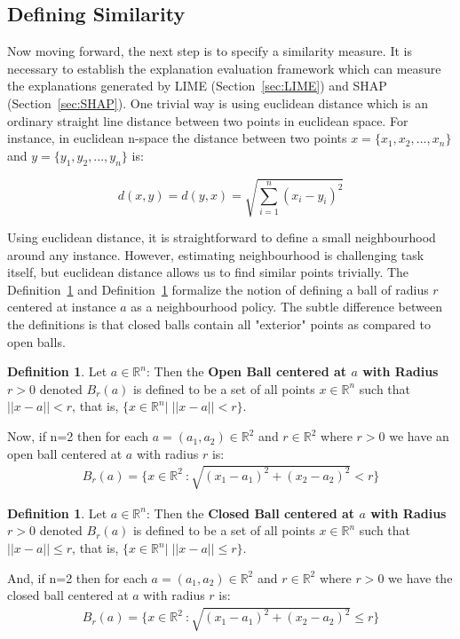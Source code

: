 \documentclass[english]{tktltiki2}
\theoremstyle{definition}
\newtheorem{definition}[thm]{Definition}
\theoremstyle{remark}
\begin{document}
\subsection{Defining Similarity}\label{sec:defining_similarity} %
Now moving forward, the next step is to specify a similarity measure. It is necessary to establish the explanation evaluation framework which can measure the explanations generated by LIME (Section~\ref{sec:LIME}) and SHAP (Section~\ref{sec:SHAP}). One trivial way is using euclidean distance which is an ordinary straight line distance between two points in euclidean space. For instance, in euclidean n-space the distance between two points $x = \{x_1, x_2, ..., x_n\}$ and $y = \{y_1, y_2, ..., y_n\}$ is:

\begin{equation}\label{eq:euclidean_distance}
d(x,y) = d(y,x) = \sqrt{\sum_{i=1}^{n}(x_i - y_i)^2}
\end{equation}

Using euclidean distance, it is straightforward to define a small neighbourhood around any instance. However, estimating neighbourhood is challenging task itself, but euclidean distance allows us to find similar points trivially. The Definition~\ref{def:1} and Definition~\ref{def:2} formalize the notion of defining a ball of radius $r$ centered at instance $a$ as a neighbourhood policy. The subtle difference between the definitions is that closed balls contain all "exterior" points as compared to open balls.

\begin{definition}\label{def:1}{Let $a \in {\mathbb{R}}^n$: Then the \textbf{Open Ball centered at $a$ with Radius $r > 0$} denoted $B_{r}(a)$ is defined to be a set of all points $x \in {\mathbb{R}}^n$ such that $||x-a|| < r$, that is, $\{x \in {\mathbb{R}}^n |\;||x - a|| < r\}.$}
\end{definition}
Now, if n=2 then for each $a = (a_1,a_2) \in {\mathbb{R}}^2$ and $r \in {\mathbb{R}}^2$ where $r > 0$ we have an open ball centered at $a$ with radius $r$ is:
\begin{align*}
B_{r}(a) = \{x \in {\mathbb{R}}^2\ : \sqrt{(x_1 - a_1)^2 + (x_2 - a_2)^2} < r\}
\end{align*}

\begin{definition}\label{def:2}{Let $a \in {\mathbb{R}}^n$: Then the \textbf{Closed Ball centered at $a$ with Radius $r > 0$} denoted $B_{r}(a)$ is defined to be a set of all points $x \in {\mathbb{R}}^n$ such that $||x-a|| \leq r$, that is, $\{x \in {\mathbb{R}}^n |\;||x - a|| \leq r\}.$}
\end{definition}
And, if n=2 then for each $a = (a_1,a_2) \in {\mathbb{R}}^2$ and $r \in {\mathbb{R}}^2$ where $r > 0$ we have the closed ball centered at $a$ with radius $r$ is:
\begin{align*}
B_{r}(a) = \{x \in {\mathbb{R}}^2\ : \sqrt{(x_1 - a_1)^2 + (x_2 - a_2)^2} \leq r\}
\end{align*}
\end{document}

